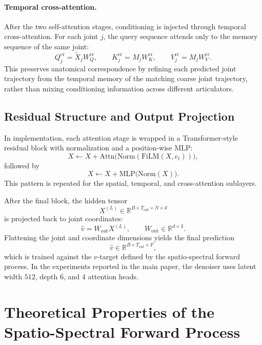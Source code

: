 \documentclass[runningheads]{llncs}
\begin{document}
\paragraph{Temporal cross-attention.}
After the two self-attention stages, conditioning is injected through temporal cross-attention. For each joint $j$, the query sequence attends only to the memory sequence of the same joint:
\[
Q_{j}^{\mathrm{cr}} = \tilde{X}_j W_Q^{\mathrm{cr}},
\qquad
K_{j}^{\mathrm{cr}} = M_j W_K^{\mathrm{cr}},
\qquad
V_{j}^{\mathrm{cr}} = M_j W_V^{\mathrm{cr}}.
\]
This preserves anatomical correspondence by refining each predicted joint trajectory from the temporal memory of the matching coarse joint trajectory, rather than mixing conditioning information across different articulators.

\subsection{Residual Structure and Output Projection}

In implementation, each attention stage is wrapped in a Transformer-style residual block with normalization and a position-wise MLP:
\[
X \leftarrow X + \mathrm{Attn}\bigl(\mathrm{Norm}(\mathrm{FiLM}(X,e_t))\bigr),
\]
followed by
\[
X \leftarrow X + \mathrm{MLP}\bigl(\mathrm{Norm}(X)\bigr).
\]
This pattern is repeated for the spatial, temporal, and cross-attention sublayers.

After the final block, the hidden tensor
\[
X^{(L)} \in \mathbb{R}^{B \times T_{\mathrm{out}} \times N \times d}
\]
is projected back to joint coordinates:
\[
\hat{v} = W_{\mathrm{out}} X^{(L)},
\qquad
W_{\mathrm{out}} \in \mathbb{R}^{d \times 3}.
\]
Flattening the joint and coordinate dimensions yields the final prediction
\[
\hat{v} \in \mathbb{R}^{B \times T_{\mathrm{out}} \times F},
\]
which is trained against the $v$-target defined by the spatio-spectral forward process. In the experiments reported in the main paper, the denoiser uses latent width $512$, depth $6$, and $4$ attention heads.

\section{Theoretical Properties of the Spatio-Spectral Forward Process}
\end{document}

